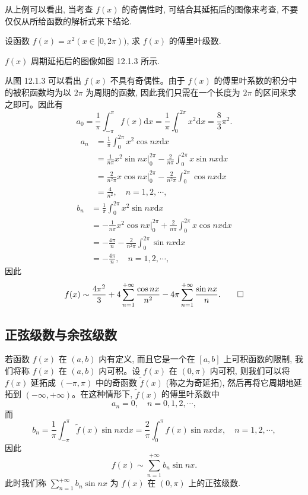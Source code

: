 \begin{remark}\label{remark:ma-12-source-7}
从上例可以看出, 当考查 $f(x)$ 的奇偶性时, 可结合其延拓后的图像来考查, 不要仅仅从所给函数的解析式来下结论.
\end{remark}


\begin{example}\label{example:ma-12-1-3}
设函数 $f(x)=x^2(x\in[0,2\pi))$, 求 $f(x)$ 的傅里叶级数.
\end{example}


\begin{solve}
$f(x)$ 周期延拓后的图像如图 12.1.3 所示.

从图 12.1.3 可以看出 $f(x)$ 不具有奇偶性。由于 $f(x)$ 的傅里叶系数的积分中的被积函数均为以 $2\pi$ 为周期的函数, 因此我们只需在一个长度为 $2\pi$ 的区间来求之即可。因此有
\[
  a_0=\frac1\pi\int_{-\pi}^{\pi}f(x)\mathrm dx
  =\frac1\pi\int_0^{2\pi}x^2\mathrm dx
  =\frac83\pi^2.
\]
\[
\begin{aligned}
  a_n
  &=\frac1\pi\int_0^{2\pi}x^2\cos nx\mathrm dx\\
  &=\frac1{n\pi}x^2\sin nx\bigg|_0^{2\pi}
    -\frac2{n\pi}\int_0^{2\pi}x\sin nx\mathrm dx\\
  &=\frac2{n^2\pi}x\cos nx\bigg|_0^{2\pi}
    -\frac2{n^2\pi}\int_0^{2\pi}\cos nx\mathrm dx\\
  &=\frac4{n^2},\quad n=1,2,\cdots,
\end{aligned}
\]
\[
\begin{aligned}
  b_n
  &=\frac1\pi\int_0^{2\pi}x^2\sin nx\mathrm dx\\
  &=-\frac1{n\pi}x^2\cos nx\bigg|_0^{2\pi}
    +\frac2{n\pi}\int_0^{2\pi}x\cos nx\mathrm dx\\
  &=-\frac{4\pi}{n}-\frac2{n^2\pi}\int_0^{2\pi}\sin nx\mathrm dx\\
  &=-\frac{4\pi}{n},\quad n=1,2,\cdots,
\end{aligned}
\]
因此
\[
  f(x)\sim\frac{4\pi^2}{3}
  +4\sum_{n=1}^{+\infty}\frac{\cos nx}{n^2}
  -4\pi\sum_{n=1}^{+\infty}\frac{\sin nx}{n}.
\qedhere
\]
\end{solve}


\subsection{正弦级数与余弦级数}
\label{subsec:ma-12-1-3}

若函数 $f(x)$ 在 $(a,b)$ 内有定义, 而且它是一个在 $[a,b]$ 上可积函数的限制, 我们将称 $f(x)$ 在 $(a,b)$ 内可积。设 $f(x)$ 在 $(0,\pi)$ 内可积, 则我们可以将 $f(x)$ 延拓成 $(-\pi,\pi)$ 中的奇函数 $\widetilde f(x)$ (称之为奇延拓), 然后再将它周期地延拓到 $(-\infty,+\infty)$。在这种情形下, $\widetilde f(x)$ 的傅里叶系数中
\[
  a_n=0,\quad n=0,1,2,\cdots,
\]
而
\[
  b_n=\frac1\pi\int_{-\pi}^{\pi}\widetilde f(x)\sin nx\mathrm dx
  =\frac2\pi\int_0^\pi f(x)\sin nx\mathrm dx,\quad n=1,2,\cdots,
\]
因此
\[
  f(x)\sim\sum_{n=1}^{+\infty}b_n\sin nx.
\]
此时我们称 $\sum\limits_{n=1}^{+\infty}b_n\sin nx$ 为 $f(x)$ 在 $(0,\pi)$ 上的正弦级数.

